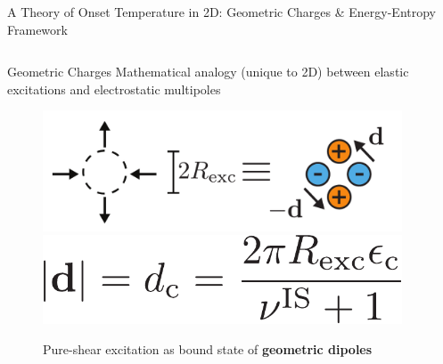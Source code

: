 



    
    


\begin{frame}{A Theory of Onset Temperature in 2D: Geometric Charges \& Energy-Entropy Framework}

\begin{columns}[T]
\begin{column}[T]{0.5\textwidth}

\begin{block}{\centering \large Geometric Charges}
Mathematical analogy (unique to 2D) between elastic excitations and electrostatic multipoles
\end{block}

\begin{figure}
\centering\includegraphics[width=0.9\linewidth]{c.2-kt_geomcharges_1/chargesequiv-2.pdf}
\vspace{-5pt}
\includegraphics[width=0.6\linewidth]{c.2-kt_geomcharges_1/dipolemag.pdf}
\caption{Pure-shear excitation as bound state of \textbf{geometric dipoles}}
\end{figure}

\end{column}

\begin{column}[T]{0.5\textwidth}


\end{column}
\end{columns}
\end{frame}
